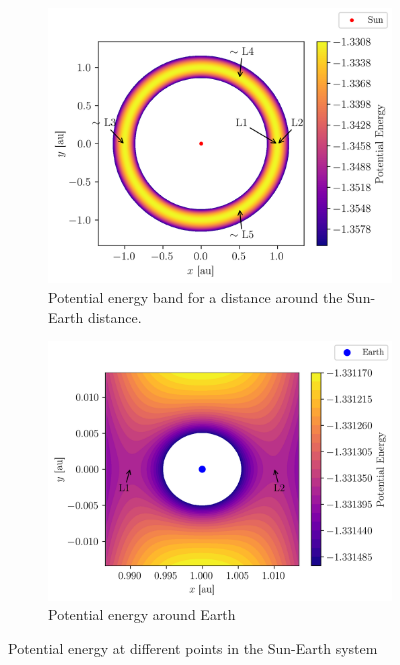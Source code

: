 \begin{figure}[h]
    \centering
    \begin{subfigure}{0.48\linewidth}
        \includegraphics[width=\linewidth]{figures/potential_global.png}
        \caption{Potential energy band for a distance around the Sun-Earth distance.}
        \label{fig:lagrange_potential_global}
    \end{subfigure}
    \begin{subfigure}{0.48\linewidth}
        \includegraphics[width=\linewidth]{figures/potential_L1_L2_zoom.png}
        \vspace*{0.2cm}
        \caption{Potential energy around Earth}
        \label{fig:lagrange_L1_L2}
    \end{subfigure}
    \caption{Potential energy at different points in the Sun-Earth system}
\end{figure}

